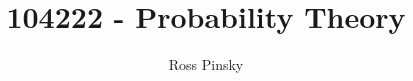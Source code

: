 \documentclass[]{article}
\title{104222 - Probability Theory}
\author{Ross Pinsky}
\begin{document}
\maketitle

\begin{abstract}

\end{abstract}

\tableofcontents


























\end{document}
